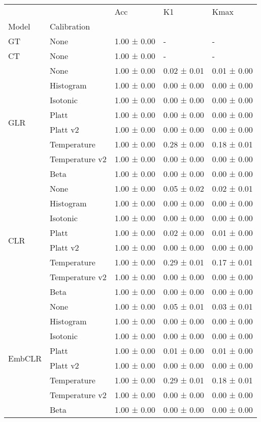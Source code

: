 \begin{tabular}{lllll}
\toprule
 &  & Acc & K1 & Kmax \\
Model & Calibration &  &  &  \\
\midrule
GT & None & 1.00 ± 0.00 & - & - \\
\cline{1-5}
CT & None & 1.00 ± 0.00 & - & - \\
\cline{1-5}
\multirow[t]{8}{*}{GLR} & None & 1.00 ± 0.00 & 0.02 ± 0.01 & 0.01 ± 0.00 \\
 & Histogram & 1.00 ± 0.00 & 0.00 ± 0.00 & 0.00 ± 0.00 \\
 & Isotonic & 1.00 ± 0.00 & 0.00 ± 0.00 & 0.00 ± 0.00 \\
 & Platt & 1.00 ± 0.00 & 0.00 ± 0.00 & 0.00 ± 0.00 \\
 & Platt v2 & 1.00 ± 0.00 & 0.00 ± 0.00 & 0.00 ± 0.00 \\
 & Temperature & 1.00 ± 0.00 & 0.28 ± 0.00 & 0.18 ± 0.01 \\
 & Temperature v2 & 1.00 ± 0.00 & 0.00 ± 0.00 & 0.00 ± 0.00 \\
 & Beta & 1.00 ± 0.00 & 0.00 ± 0.00 & 0.00 ± 0.00 \\
\cline{1-5}
\multirow[t]{8}{*}{CLR} & None & 1.00 ± 0.00 & 0.05 ± 0.02 & 0.02 ± 0.01 \\
 & Histogram & 1.00 ± 0.00 & 0.00 ± 0.00 & 0.00 ± 0.00 \\
 & Isotonic & 1.00 ± 0.00 & 0.00 ± 0.00 & 0.00 ± 0.00 \\
 & Platt & 1.00 ± 0.00 & 0.02 ± 0.00 & 0.01 ± 0.00 \\
 & Platt v2 & 1.00 ± 0.00 & 0.00 ± 0.00 & 0.00 ± 0.00 \\
 & Temperature & 1.00 ± 0.00 & 0.29 ± 0.01 & 0.17 ± 0.01 \\
 & Temperature v2 & 1.00 ± 0.00 & 0.00 ± 0.00 & 0.00 ± 0.00 \\
 & Beta & 1.00 ± 0.00 & 0.00 ± 0.00 & 0.00 ± 0.00 \\
\cline{1-5}
\multirow[t]{8}{*}{EmbCLR} & None & 1.00 ± 0.00 & 0.05 ± 0.01 & 0.03 ± 0.01 \\
 & Histogram & 1.00 ± 0.00 & 0.00 ± 0.00 & 0.00 ± 0.00 \\
 & Isotonic & 1.00 ± 0.00 & 0.00 ± 0.00 & 0.00 ± 0.00 \\
 & Platt & 1.00 ± 0.00 & 0.01 ± 0.00 & 0.01 ± 0.00 \\
 & Platt v2 & 1.00 ± 0.00 & 0.00 ± 0.00 & 0.00 ± 0.00 \\
 & Temperature & 1.00 ± 0.00 & 0.29 ± 0.01 & 0.18 ± 0.01 \\
 & Temperature v2 & 1.00 ± 0.00 & 0.00 ± 0.00 & 0.00 ± 0.00 \\
 & Beta & 1.00 ± 0.00 & 0.00 ± 0.00 & 0.00 ± 0.00 \\
\cline{1-5}
\bottomrule
\end{tabular}
